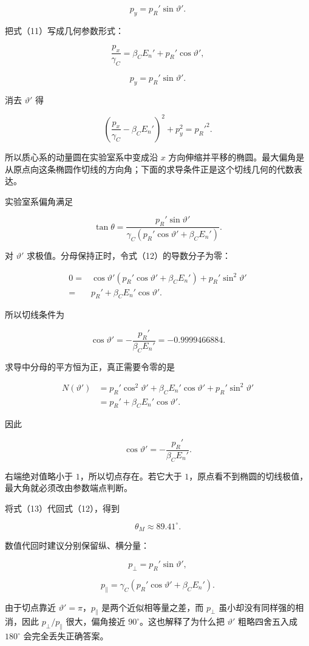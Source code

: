 \documentclass[12pt,a4paper,UTF8]{ctexart}
\begin{document}
\[p_y=p_R'\sin\vartheta'. \tag{11}\]

把式（11）写成几何参数形式：

\[\frac{p_x}{\gamma_C}=\beta_CE_n'+p_R'\cos\vartheta',\]

\[p_y=p_R'\sin\vartheta'.\]

消去 \(\vartheta'\) 得

\[\left(\frac{p_x}{\gamma_C}-\beta_CE_n'\right)^2+p_y^2=p_R'^2.\]

所以质心系的动量圆在实验室系中变成沿 \(x\)
方向伸缩并平移的椭圆。最大偏角是从原点向这条椭圆作切线的方向角；下面的求导条件正是这个切线几何的代数表达。

实验室系偏角满足

\[\tan\theta
=\frac{p_R'\sin\vartheta'}
{\gamma_C(p_R'\cos\vartheta'+\beta_CE_n')}. \tag{12}\]

对 \(\vartheta'\) 求极值。分母保持正时，令式（12）的导数分子为零：

\[\begin{aligned}
0={}&\cos\vartheta'
(p_R'\cos\vartheta'+\beta_CE_n')
+p_R'\sin^2\vartheta'\\
={}&p_R'+\beta_CE_n'\cos\vartheta'.
\end{aligned}\]

所以切线条件为

\[\boxed{
\cos\vartheta'=-\frac{p_R'}{\beta_CE_n'}
=-0.9999466884
}. \tag{13}\]

求导中分母的平方恒为正，真正需要令零的是

\[\begin{aligned}
N(\vartheta')
&=p_R'\cos^2\vartheta'
+\beta_CE_n'\cos\vartheta'
+p_R'\sin^2\vartheta'\\
&=p_R'+\beta_CE_n'\cos\vartheta'.
\end{aligned}\]

因此

\[\cos\vartheta'=-\frac{p_R'}{\beta_CE_n'}.\]

右端绝对值略小于 \(1\)，所以切点存在。若它大于
\(1\)，原点看不到椭圆的切线极值，最大角就必须改由参数端点判断。

将式（13）代回式（12），得到

\[\boxed{\theta_M\approx89.41^\circ}. \tag{14}\]

数值代回时建议分别保留纵、横分量：

\[p_{\perp}=p_R'\sin\vartheta',\]

\[p_{\parallel}=\gamma_C
(p_R'\cos\vartheta'+\beta_CE_n').\]

由于切点靠近 \(\vartheta'=\pi\)，\(p_{\parallel}\)
是两个近似相等量之差，而 \(p_{\perp}\) 虽小却没有同样强的相消，因此
\(p_{\perp}/p_{\parallel}\) 很大，偏角接近
\(90^\circ\)。这也解释了为什么把 \(\vartheta'\) 粗略四舍五入成
\(180^\circ\) 会完全丢失正确答案。
\end{document}
